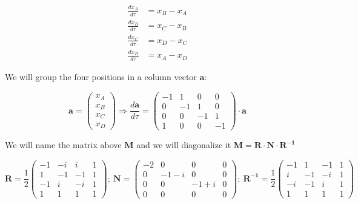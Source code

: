 \documentclass{article}
\newcommand{\vect}[1]{\mathbf{#1}}
\newcommand{\mat}[1]{\mathbf{#1}}
\begin{document}
\begin{align*}
    \frac{dx_A}{d\tau} &= x_B - x_A \\
    \frac{dx_B}{d\tau} &= x_C - x_B \\
    \frac{dx_C}{d\tau} &= x_D - x_C \\
    \frac{dx_D}{d\tau} &= x_A - x_D
\end{align*}

We will group the four positions in a column vector $\vect a$:

\begin{equation*}
\vect a = \begin{pmatrix}
    x_A \\
    x_B \\
    x_C \\
    x_D
\end{pmatrix} \Rightarrow
\frac{d \vect a}{d\tau} = \begin{pmatrix}
    -1 & 1 & 0 & 0 \\
    0 & -1 & 1 & 0 \\
    0 & 0 & -1 & 1 \\
    1 & 0 & 0 & -1
\end{pmatrix} \cdot \vect a
\end{equation*}

We will name the matrix above $\mat{M}$ and we will diagonalize it $\mat{M} = \mat{R} \cdot \mat{N} \cdot \mat{R^{-1}}$

\begin{equation*}
\mat{R} = \frac{1}{2}\begin{pmatrix}
    -1 & -i & i & 1 \\
    1 & -1 & -1 & 1 \\
    -1 & i & -i & 1 \\
    1 & 1 & 1 & 1
\end{pmatrix}; \:
\mat{N} = \begin{pmatrix}
    -2 & 0 & 0 & 0 \\
    0 & -1-i & 0 & 0 \\
    0 & 0 & -1+i & 0 \\
    0 & 0 & 0 & 0
\end{pmatrix}; \:
\mat{R^{-1}} = \frac{1}{2}\begin{pmatrix}
    -1 & 1 & -1 & 1 \\
    i & -1 & -i & 1 \\
    -i & -1 & i & 1 \\
    1 & 1 & 1 & 1
\end{pmatrix}
\end{equation*}
\end{document}
